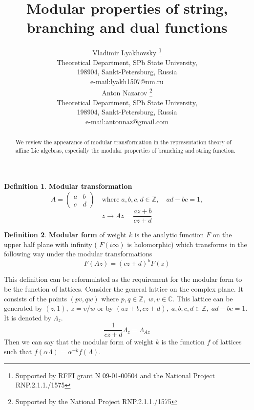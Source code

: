 \documentclass[a4paper,12pt]{article}
\theoremstyle{definition} \newtheorem{Def}{Definition}
\begin{document}
\title{Modular properties of string, branching and dual functions}

\author{Vladimir Lyakhovsky \thanks{ Supported by
 RFFI grant N 09-01-00504 and the National Project RNP.2.1.1./1575 }\\
Theoretical Department, SPb State University,\\
198904, Sankt-Petersburg, Russia \\
e-mail:lyakh1507@nm.ru \\
[5mm] Anton Nazarov \thanks{ Supported by
the National Project RNP.2.1.1./1575 }\\
Theoretical Department, SPb State University,\\
198904, Sankt-Petersburg, Russia \\
e-mail:antonnaz@gmail.com
}
\maketitle

\begin{abstract}
  We review the appearance of modular transformation in the representation theory of affine Lie algebras, especially the modular properties of branching and string function.
\end{abstract}
\begin{Def}
  {\bf Modular transformation}
  \begin{equation}
    \label{eq:1}
    A=
    \begin{pmatrix} a & b\\ c & d
    \end{pmatrix} \quad\mbox{where}\; a,b,c,d\in\mathbb{Z},\quad ad-bc=1,
  \end{equation}
  \begin{equation}
    \label{eq:2}
    z\to A z=\frac{az+b}{cz+d}
  \end{equation}
\end{Def}
\begin{Def}
  {\bf Modular form} of weight $k$ is the analytic function $F$ on the upper half plane with infinity ( $F(i\infty)$ is holomorphic) which transforms in the following way under the modular transformations
  \begin{equation}
    \label{eq:3}
    F(Az)=(cz+d)^k F(z)
  \end{equation}
\end{Def}

This definition can be reformulated as the requirement for the modular form to be the function of lattices. 
Consider the general lattice on the complex plane. It consists of the points $(pv,qw)$ where $p,q\in \mathbb{Z},\; w,v\in \mathbb{C}$. This lattice can be generated by $(z,1), \; z=v/w$ or by $(az+b,cz+d), \; a,b,c,d\in\mathbb{Z},\; ad-bc=1$. It is denoted by $\Lambda_z$.
\begin{equation}
  \label{eq:4}
  \frac{1}{cz+d}\Lambda_z=\Lambda_{Az}
\end{equation}
Then we can say that the modular form of weight $k$ is the function $f$ of lattices such that $f(\alpha\Lambda)=\alpha^{-k}f(\Lambda)$.
\end{document}
